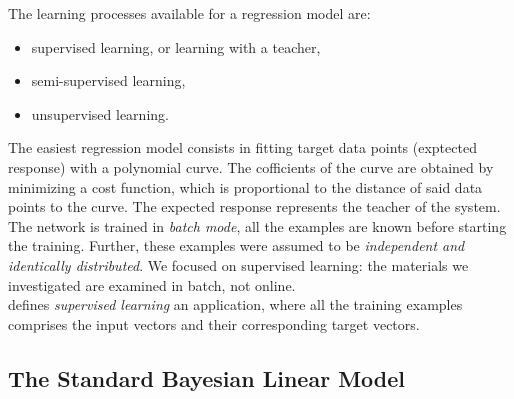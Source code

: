 The learning processes available for a regression model are:

\begin{itemize}
  \item{supervised learning, or learning with a teacher,}
  \item{semi-supervised learning,}
  \item{unsupervised learning.}
\end{itemize}

The easiest regression model consists in fitting target data
points (exptected response) with a polynomial curve.
The cofficients of the curve are obtained by minimizing a cost function, which
is proportional to the distance of said data points to the curve.
The expected response represents the teacher of the system.
The network is trained in \textit{batch mode}, all the examples are known before
starting the training.
Further, these examples were assumed to be \textit{independent and identically
distributed}.
We focused on supervised learning: the materials we investigated
are examined in batch, not online.\\
\citet{RefWorks:194} defines \textit{supervised learning} an application, where all the
training examples comprises the input vectors and their corresponding target
vectors.


\subsection{The Standard Bayesian Linear Model}
\label{subsec:standardlinearmodel}

